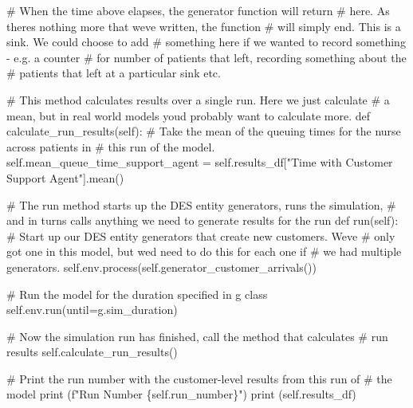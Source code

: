 \documentclass[
  letterpaper,
  DIV=11,
  numbers=noendperiod]{scrreprt}
\newenvironment{Shaded}{}{}
\newcommand{\BuiltInTok}[1]{\textcolor[rgb]{0.84,0.23,0.29}{#1}}
\newcommand{\CommentTok}[1]{\textcolor[rgb]{0.42,0.45,0.49}{#1}}
\newcommand{\KeywordTok}[1]{\textcolor[rgb]{0.84,0.23,0.29}{#1}}
\newcommand{\NormalTok}[1]{\textcolor[rgb]{0.14,0.16,0.18}{#1}}
\newcommand{\OperatorTok}[1]{\textcolor[rgb]{0.14,0.16,0.18}{#1}}
\newcommand{\SpecialCharTok}[1]{\textcolor[rgb]{0.00,0.36,0.77}{#1}}
\newcommand{\SpecialStringTok}[1]{\textcolor[rgb]{0.01,0.18,0.38}{#1}}
\newcommand{\StringTok}[1]{\textcolor[rgb]{0.01,0.18,0.38}{#1}}
\newcommand{\VariableTok}[1]{\textcolor[rgb]{0.89,0.38,0.04}{#1}}
\begin{document}
\begin{tcolorbox}
\begin{Shaded}
\begin{Highlighting}[]
            \CommentTok{\# When the time above elapses, the generator function will return}
            \CommentTok{\# here.  As there\textquotesingle{}s nothing more that we\textquotesingle{}ve written, the function}
            \CommentTok{\# will simply end.  This is a sink.  We could choose to add}
            \CommentTok{\# something here if we wanted to record something {-} e.g. a counter}
            \CommentTok{\# for number of patients that left, recording something about the}
            \CommentTok{\# patients that left at a particular sink etc.}

    \CommentTok{\# This method calculates results over a single run.  Here we just calculate}
    \CommentTok{\# a mean, but in real world models you\textquotesingle{}d probably want to calculate more.}
    \KeywordTok{def}\NormalTok{ calculate\_run\_results(}\VariableTok{self}\NormalTok{):}
        \CommentTok{\# Take the mean of the queuing times for the nurse across patients in}
        \CommentTok{\# this run of the model.}
        \VariableTok{self}\NormalTok{.mean\_queue\_time\_support\_agent }\OperatorTok{=} \VariableTok{self}\NormalTok{.results\_df[}\StringTok{"Time with Customer Support Agent"}\NormalTok{].mean()}

    \CommentTok{\# The run method starts up the DES entity generators, runs the simulation,}
    \CommentTok{\# and in turns calls anything we need to generate results for the run}
    \KeywordTok{def}\NormalTok{ run(}\VariableTok{self}\NormalTok{):}
        \CommentTok{\# Start up our DES entity generators that create new customers.  We\textquotesingle{}ve}
        \CommentTok{\# only got one in this model, but we\textquotesingle{}d need to do this for each one if}
        \CommentTok{\# we had multiple generators.}
        \VariableTok{self}\NormalTok{.env.process(}\VariableTok{self}\NormalTok{.generator\_customer\_arrivals())}

        \CommentTok{\# Run the model for the duration specified in g class}
        \VariableTok{self}\NormalTok{.env.run(until}\OperatorTok{=}\NormalTok{g.sim\_duration)}

        \CommentTok{\# Now the simulation run has finished, call the method that calculates}
        \CommentTok{\# run results}
        \VariableTok{self}\NormalTok{.calculate\_run\_results()}

        \CommentTok{\# Print the run number with the customer{-}level results from this run of}
        \CommentTok{\# the model}
        \BuiltInTok{print}\NormalTok{ (}\SpecialStringTok{f"Run Number }\SpecialCharTok{\{}\VariableTok{self}\SpecialCharTok{.}\NormalTok{run\_number}\SpecialCharTok{\}}\SpecialStringTok{"}\NormalTok{)}
        \BuiltInTok{print}\NormalTok{ (}\VariableTok{self}\NormalTok{.results\_df)}
\end{Highlighting}
\end{Shaded}

\end{tcolorbox}
\end{document}
